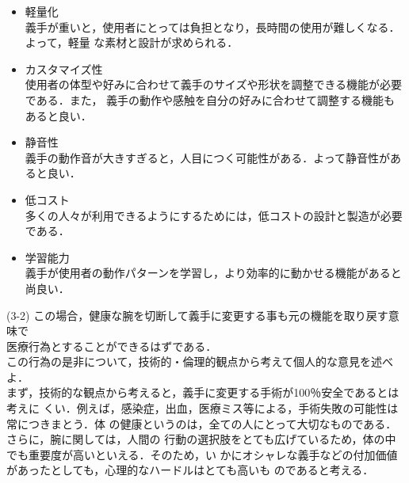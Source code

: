 \documentclass{jsarticle}
\begin{document}
\begin{itemize}
  \item  軽量化\\
  \hspace*{5.5zw}義手が重いと，使用者にとっては負担となり，長時間の使用が難しくなる．よって，軽量
  \hspace*{5.5zw}な素材と設計が求められる．\\

  \item カスタマイズ性\\
  \hspace*{5.5zw}使用者の体型や好みに合わせて義手のサイズや形状を調整できる機能が必要である．また，
  \hspace*{5.5zw}義手の動作や感触を自分の好みに合わせて調整する機能もあると良い．\\

  \item 静音性\\
  \hspace*{5.5zw}義手の動作音が大きすぎると，人目につく可能性がある．よって静音性があると良い．\\

  \item 低コスト\\
  \hspace*{5.5zw}多くの人々が利用できるようにするためには，低コストの設計と製造が必要である．\\

  \item  学習能力\\
  \hspace*{5.5zw}義手が使用者の動作パターンを学習し，より効率的に動かせる機能があると尚良い．\\

\end{itemize}
\newpage
\vspace*{-10zh}
\hspace*{4.7zw}(3-2) この場合，健康な腕を切断して義手に変更する事も元の機能を取り戻す意味で\\
\hspace*{8.4zw}医療行為とすることができるはずである．\\
\hspace*{8.4zw}この行為の是非について，技術的・倫理的観点から考えて個人的な意見を述べよ．\\

\hspace*{8.4zw}まず，技術的な観点から考えると，義手に変更する手術が100％安全であるとは考えに
\hspace*{8.4zw}くい．例えば，感染症，出血，医療ミス等による，手術失敗の可能性は常につきまとう．体
\hspace*{8.4zw}の健康というのは，全ての人にとって大切なものである．さらに，腕に関しては，人間の
\hspace*{8.4zw}行動の選択肢をとても広げているため，体の中でも重要度が高いといえる．そのため，い
\hspace*{8.4zw}かにオシャレな義手などの付加価値があったとしても，心理的なハードルはとても高いも
\hspace*{8.4zw}のであると考える．
\end{document}

